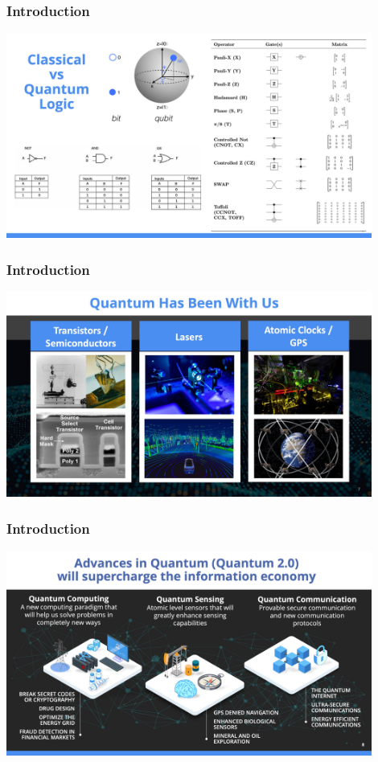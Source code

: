 \documentclass{beamer}
\begin{document}
\begin{frame}\frametitle{Introduction}
\begin{center}
\includegraphics[width=12cm]{fig/Slide6.jpeg}
\end{center}
\end{frame}

\begin{frame}\frametitle{Introduction}
\begin{center}
\includegraphics[width=12cm]{fig/Slide7.jpeg}
\end{center}
\end{frame}

\begin{frame}\frametitle{Introduction}
\begin{center}
\includegraphics[width=12cm]{fig/Slide8.jpeg}
\end{center}
\end{frame}
\end{document}

